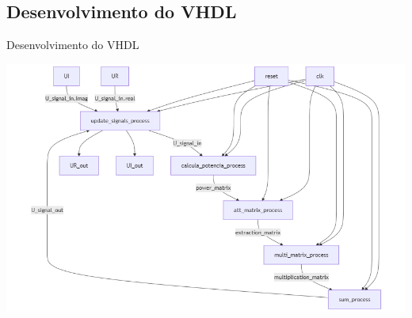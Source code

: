 \documentclass{if-beamer}
\begin{document}
\subsection{Desenvolvimento do VHDL}
\begin{frame}{Desenvolvimento do VHDL}
	
		\includegraphics[scale=0.3]{diagrama atualizado.png}
\end{frame}
\end{document}
